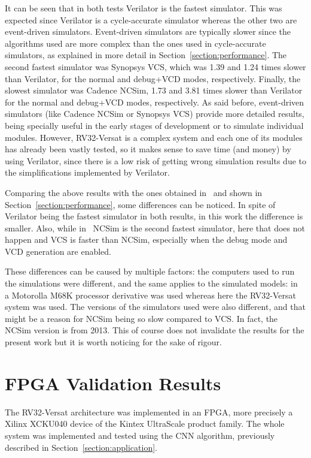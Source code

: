 It can be seen that in both tests Verilator is the fastest simulator. This was
expected since Verilator is a cycle-accurate simulator whereas the other two are
event-driven simulators. Event-driven simulators are typically slower since the
algorithms used are more complex than the ones used in cycle-accurate
simulators, as explained in more detail in Section~\ref{section:performance}. The
second fastest simulator was Synopsys VCS, which was 1.39 and 1.24 times slower
than Verilator, for the normal and debug+\ac{VCD} modes, respectively. Finally, the
slowest simulator was Cadence NCSim, 1.73 and 3.81 times slower than
Verilator for the normal and debug+\ac{VCD} modes, respectively. As said before,
event-driven simulators (like Cadence NCSim or Synopsys VCS) provide more
detailed results, being specially useful in the early stages of development or
to simulate individual modules. However, RV32-Versat is a complex system and
each one of its modules has already been vastly tested, so it makes sense to
save time (and money) by using Verilator, since there is a low risk of getting
wrong simulation results due to the simplifications implemented by Verilator.

Comparing the above results with the ones obtained
in~\cite{verilator:benchmarks} and shown in Section~\ref{section:performance},
some differences can be noticed. In spite of Verilator being the fastest
simulator in both results, in this work the difference is smaller. Also, while
in~\cite{verilator:benchmarks} NCSim is the second fastest simulator, here that
does not happen and VCS is faster than NCSim, especially when the debug mode and
\ac{VCD} generation are enabled.

These differences can be caused by multiple factors: the computers used to run
the simulations were different, and the same applies to the simulated models:
in~\cite{verilator:benchmarks} a Motorolla M68K processor derivative was used
whereas here the RV32-Versat system was used. The versions of the simulators
used were also different, and that might be a reason for NCSim being
so slow compared to VCS. In fact, the NCSim version is from 2013. This of course
does not invalidate the results for the present work but it is worth noticing for
the sake of rigour.


\section{FPGA Validation Results}
\label{section:fpga}

The RV32-Versat architecture was implemented in an \ac{FPGA}, more precisely a Xilinx
XCKU040 device of the Kintex UltraScale product family. The whole system was
implemented and tested using the CNN algorithm, previously described in
Section~\ref{section:application}.

